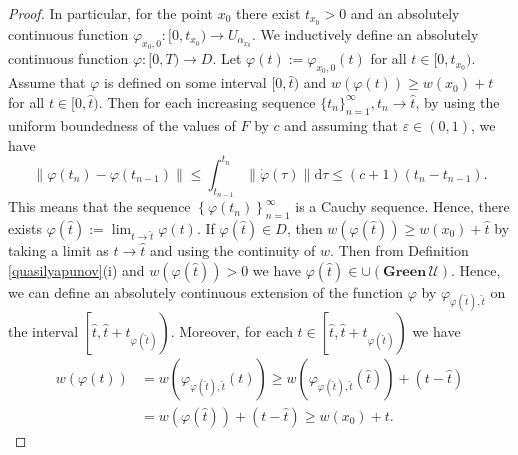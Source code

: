 \documentclass[a4paper]{article}
\begin{document}
\begin{proof}
    In particular, for the point $x_0$ there exist $t_{x_0}>0$ and an absolutely continuous function $\varphi_{x_0,0} : [0,t_{x_0}) \to U_{\alpha_{x_0}}$. We inductively define an absolutely continuous function $\varphi : [0,T) \to D$.
    Let $\varphi(t) := \varphi_{x_0,0}(t)$ for all $t \in [0,t_{x_0})$. Assume that $\varphi$ is defined on some interval $[0,\hat{t})$ and $w(\varphi(t)) \ge w(x_0) + t$ for all $t \in [0,\hat{t})$.
    Then for each increasing sequence $\{t_n\}_{n=1}^{\infty}, t_n \xrightarrow[]{} \hat{t}$, by using the uniform boundedness of the values of $F$ by $c$ and assuming that $\varepsilon \in (0,1)$, we have
    $$\left\|\varphi(t_n)-\varphi(t_{n-1})\right\| \le \int_{t_{n-1}}^{t_n} \left\|\dot{\varphi}(\tau)\right\|\mathrm{d}\tau \le (c+1)(t_n-t_{n-1}).$$
    This means that the sequence $\left\{\varphi(t_n)\right\}_{n=1}^{\infty}$ is a Cauchy sequence. Hence, there exists $\varphi(\hat{t}) := \lim_{t \to \hat{t}} \varphi(t)$.
    If $\varphi(\hat{t}) \in D$, then $w(\varphi(\hat{t})) \ge w(x_0) + \hat{t}$ by taking a limit as $t \to \hat{t}$ and using the continuity of $w$. Then from Definition \ref{quasilyapunov}(i) and $w(\varphi(\hat{t})) > 0$ we have $\varphi(\hat{t}) \in \cup(\mathbf{Green} \,\mathcal{U})$. Hence, we can define an absolutely continuous extension of the function $\varphi$ by $\varphi_{\varphi(\hat{t}),\hat{t}}$ on the interval $\left[\hat{t},\hat{t}+t_{\varphi(\hat{t})}\right)$.
    Moreover, for each $t \in \left[\hat{t},\hat{t}+t_{\varphi(\hat{t})}\right)$ we have
    \begin{align*}
    w(\varphi(t)) &= w(\varphi_{\varphi(\hat{t}),\hat{t}}(t)) \ge w(\varphi_{\varphi(\hat{t}),\hat{t}}(\hat{t})) + (t-\hat{t})\\
    &= w(\varphi(\hat{t}))+ (t-\hat{t})
    \ge w(x_0) + t.
    \end{align*}


\end{proof}
\end{document}
